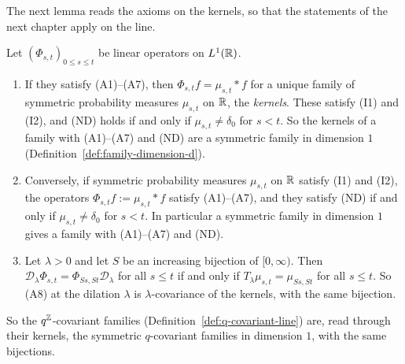 The next lemma reads the axioms on the kernels, so that the statements of the next chapter apply
on the line.

\begin{lemma}
\label{lem:line-axioms-kernels}
\leanok
{}
Let $(\Phi_{s,t})_{0 \le s \le t}$ be linear operators on $L^1(\mathbb{R})$.
\begin{enumerate}
\item If they satisfy (A1)--(A7), then $\Phi_{s,t}f = \mu_{s,t} * f$ for a unique family of
symmetric probability measures $\mu_{s,t}$ on $\mathbb{R}$, the \emph{kernels}. These satisfy (I1) and
(I2), and (ND) holds if and only if $\mu_{s,t} \ne \delta_0$ for $s < t$. So the kernels of a
family with (A1)--(A7) and (ND) are a symmetric family in dimension $1$
(Definition~\ref{def:family-dimension-d}).
\item Conversely, if symmetric probability measures $\mu_{s,t}$ on $\mathbb{R}$ satisfy (I1) and (I2),
the operators $\Phi_{s,t}f := \mu_{s,t} * f$ satisfy (A1)--(A7), and they satisfy (ND) if and
only if $\mu_{s,t} \ne \delta_0$ for $s < t$. In particular a symmetric family in dimension $1$
gives a family with (A1)--(A7) and (ND).
\item Let $\lambda > 0$ and let $S$ be an increasing bijection of $[0,\infty)$. Then
$\mathcal{D}_\lambda\Phi_{s,t} = \Phi_{Ss,St}\mathcal{D}_\lambda$ for all $s \le t$ if and only
if $T_\lambda\mu_{s,t} = \mu_{Ss,St}$ for all $s \le t$. So (A8) at the dilation $\lambda$ is
$\lambda$-covariance of the kernels, with the same bijection.
\end{enumerate}
So the $q^{\mathbb{Z}}$-covariant families (Definition~\ref{def:q-covariant-line}) are, read through their
kernels, the symmetric $q$-covariant families in dimension $1$, with the same bijections.

\end{lemma}
